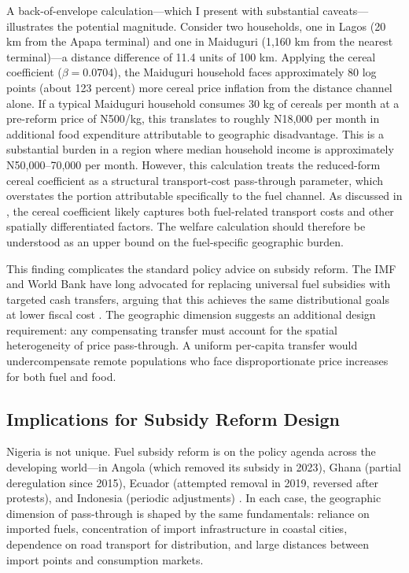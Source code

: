 \documentclass[12pt]{article}
\newcommand{\naira}{\textnigerian}
\renewcommand{\naira}{\mbox{\rlap{\hspace{0.09em}=}N}}
\begin{document}
A back-of-envelope calculation---which I present with substantial caveats---illustrates the potential magnitude. Consider two households, one in Lagos (20 km from the Apapa terminal) and one in Maiduguri (1,160 km from the nearest terminal)---a distance difference of 11.4 units of 100 km. Applying the cereal coefficient ($\beta = 0.0704$), the Maiduguri household faces approximately 80 log points (about 123 percent) more cereal price inflation from the distance channel alone. If a typical Maiduguri household consumes 30 kg of cereals per month at a pre-reform price of \naira{}500/kg, this translates to roughly \naira{}18,000 per month in additional food expenditure attributable to geographic disadvantage. This is a substantial burden in a region where median household income is approximately \naira{}50,000--70,000 per month. However, this calculation treats the reduced-form cereal coefficient as a structural transport-cost pass-through parameter, which overstates the portion attributable specifically to the fuel channel. As discussed in , the cereal coefficient likely captures both fuel-related transport costs and other spatially differentiated factors. The welfare calculation should therefore be understood as an upper bound on the fuel-specific geographic burden.

This finding complicates the standard policy advice on subsidy reform. The IMF and World Bank have long advocated for replacing universal fuel subsidies with targeted cash transfers, arguing that this achieves the same distributional goals at lower fiscal cost \citep{IMF2019,WorldBank2022}. The geographic dimension suggests an additional design requirement: any compensating transfer must account for the spatial heterogeneity of price pass-through. A uniform per-capita transfer would undercompensate remote populations who face disproportionate price increases for both fuel and food.

\subsection{Implications for Subsidy Reform Design}

Nigeria is not unique. Fuel subsidy reform is on the policy agenda across the developing world---in Angola (which removed its subsidy in 2023), Ghana (partial deregulation since 2015), Ecuador (attempted removal in 2019, reversed after protests), and Indonesia (periodic adjustments) \citep{Rentschler2017,Clements2013}. In each case, the geographic dimension of pass-through is shaped by the same fundamentals: reliance on imported fuels, concentration of import infrastructure in coastal cities, dependence on road transport for distribution, and large distances between import points and consumption markets.
\end{document}
